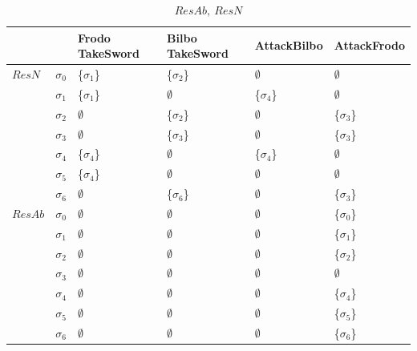 \documentclass[11pt,a4paper]{article}
\begin{document}
\begin{table}
\centering
\caption{$ResAb,~ ResN$}
\begin{tabular}{|l|l|l|l|l|l|}
\hline
     &   & Frodo TakeSword & Bilbo TakeSword & AttackBilbo & AttackFrodo \\ \hline
$ResN$ & $\sigma_0$ &  \{$\sigma_1$\} & \{$\sigma_2$\} & $\emptyset$ & $\emptyset$   \\ \hline
     & $\sigma_1$ &  \{$\sigma_1$\}  & $\emptyset$ & \{$\sigma_4$\}   &  $\emptyset$  \\ \hline
     & $\sigma_2$ &  $\emptyset$  & \{$\sigma_2$\} & $\emptyset$   &  \{$\sigma_3$\}  \\ \hline
     & $\sigma_3$ &  $\emptyset$  & \{$\sigma_3$\} & $\emptyset$   &  \{$\sigma_3$\}  \\ \hline
     & $\sigma_4$ &  \{$\sigma_4$\}  & $\emptyset$ & \{$\sigma_4$\}   &  $\emptyset$  \\ \hline
     & $\sigma_5$ &  \{$\sigma_4$\}  & $\emptyset$ & $\emptyset$   &  $\emptyset$  \\ \hline
     & $\sigma_6$ &  $\emptyset$  & \{$\sigma_6$\} & $\emptyset$   &  \{$\sigma_3$\}  \\ \hline
 $ResAb$ & $\sigma_0$ &  $\emptyset$ & $\emptyset$ & $\emptyset$ & \{$\sigma_0$\}  \\ \hline
     & $\sigma_1$ &  $\emptyset$  & $\emptyset$ & $\emptyset$   &  \{$\sigma_1$\}  \\ \hline
     & $\sigma_2$ &  $\emptyset$  & $\emptyset$ & $\emptyset$   &  \{$\sigma_2$\}  \\ \hline
     & $\sigma_3$ &  $\emptyset$  & $\emptyset$ & $\emptyset$   &  $\emptyset$  \\ \hline
     & $\sigma_4$ &  $\emptyset$  & $\emptyset$ & $\emptyset$   &  \{$\sigma_4$\}  \\ \hline
     & $\sigma_5$ &  $\emptyset$  & $\emptyset$ & $\emptyset$   &  \{$\sigma_5$\}  \\ \hline
     & $\sigma_6$ &  $\emptyset$  & $\emptyset$ & $\emptyset$   &  \{$\sigma_6$\}  \\ \hline          
\end{tabular}
\end{table}
\end{document}
